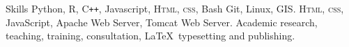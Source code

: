 
\begin{rubric}{Skills}
	Python, R, C\texttt{++}, Javascript, \textsc{Html, css}, Bash
\entry*[Technologies]
	Git, Linux, GIS.
	\textsc{Html, css}, JavaScript, Apache Web Server, Tomcat Web Server.
\entry*[Misc.]
	Academic research, teaching, training, consultation, \LaTeX\ typesetting and publishing.
\end{rubric}